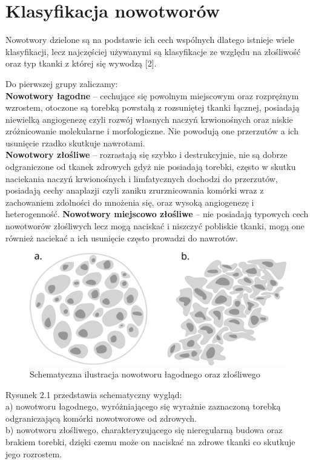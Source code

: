 \documentclass[a4paper,12pt,oneside]{book}
\begin{document}
\section{Klasyfikacja nowotworów}
Nowotwory dzielone są na podstawie ich cech wspólnych dlatego istnieje wiele klasyfikacji, lecz najczęściej używanymi są klasyfikacje ze względu na złośliwość oraz typ tkanki z której się wywodzą [2].\par
Do pierwszej grupy zaliczamy:\\
\textbf{Nowotwory łagodne} – cechujące się powolnym miejscowym oraz rozprężnym wzrostem, otoczone są torebką powstałą z rozsuniętej tkanki łącznej, posiadają niewielką angiogenezę czyli rozwój własnych naczyń krwionośnych oraz niskie zróżnicowanie molekularne i morfologiczne. Nie powodują one przerzutów a ich usunięcie rzadko skutkuje nawrotami.\\
\textbf{Nowotwory złośliwe} – rozrastają się szybko i destrukcyjnie, nie są dobrze odgraniczone od tkanek zdrowych gdyż nie posiadają torebki, często w skutku naciekania naczyń krwionośnych i limfatycznych dochodzi do przerzutów, posiadają cechy anaplazji czyli zaniku zrurznicowania komórki wraz z zachowaniem zdolności do mnożenia się, oraz wysoką angiogenezę i heterogenność.\newline \newline
\textbf{Nowotwory miejscowo złośliwe} – nie posiadają typowych cech nowotworów złośliwych lecz mogą naciskać i niszczyć pobliskie tkanki, mogą one również naciekać a ich usunięcie często prowadzi do nawrotów.

\begin{figure}[h]
\centering
\includegraphics[scale=0.5]{KlasyfikacjaNowotworu.png}
\caption{Schematyczna ilustracja nowotworu łagodnego oraz złośliwego }
\end{figure}

Rysunek 2.1 przedstawia schematyczny wygląd:\\
a) nowotworu łagodnego, wyróżniającego się wyrażnie zaznaczoną torebką odgraniczającą komórki nowotworowe od zdrowych.\\
b) nowotworu złośliwego, charakteryzującego się nieregularną budowa oraz brakiem torebki, dzięki czemu może on naciskać na zdrowe tkanki co skutkuje jego rozrostem.\\
\end{document}
